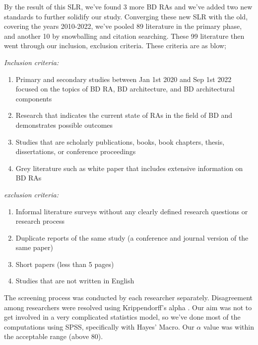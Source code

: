 \documentclass{bmcart}
\begin{document}
\begin{enumerate}
    By the result of this SLR, we've found 3 more BD RAs \cite{AtaeiApsec,castellanos2021smart,sang2017simplifying} and we've added two new standards \cite{ISO20546,ISO20547} to further solidify our study. Converging these new SLR with the old, covering the years 2010-2022, we've pooled 89 literature in the primary phase, and another 10 by snowballing and citation searching. These 99 literature then went through our inclusion, exclusion criteria. These criteria are as blow;

        \textit{Inclusion criteria:}
        \begin{enumerate}
            \item Primary and secondary studies between Jan 1st 2020 and Sep 1st 2022 focused on the topics of BD RA, BD architecture, and BD architectural components
            \item Research that indicates the current state of RAs in the field of BD and demonstrates possible outcomes
            \item Studies that are scholarly publications, books, book chapters, thesis, dissertations, or conference proceedings 
            \item Grey literature such as white paper that includes extensive information on BD RAs
        \end{enumerate}
        \textit{exclusion criteria:}
        \begin{enumerate}
            \item Informal literature surveys without any clearly defined research questions or research process
            \item Duplicate reports of the same study (a conference and journal version of the same paper)
            \item Short papers (less than 5 pages)
            \item Studies that are not written in English
        \end{enumerate}


\end{enumerate}

The screening process was conducted by each researcher separately. Disagreement among researchers were resolved using Krippendorff’s alpha \cite{krippendorff2011computing}. Our aim was not to get involved in a very complicated statistics model, so we've done most of the computations using SPSS, specifically with Hayes’ Macro. Our $ \alpha $ value was within the acceptable range (above 80). 
\end{document}
